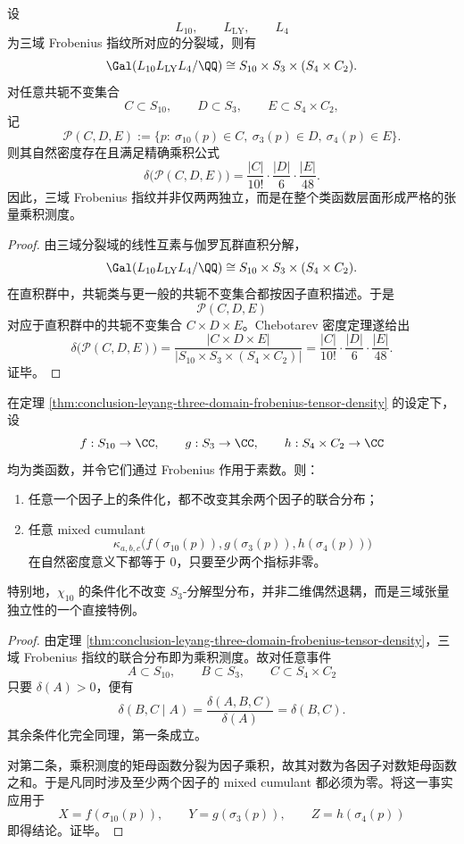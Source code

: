 \begin{theorem}\label{thm:conclusion-leyang-three-domain-frobenius-tensor-density}
设
\[
L_{10},\qquad L_{\mathrm{LY}},\qquad L_4
\]
为三域 Frobenius 指纹所对应的分裂域，则有
\[
\Gal(L_{10}L_{\mathrm{LY}}L_4/\QQ)
\cong
S_{10}\times S_3\times (S_4\times C_2).
\]
对任意共轭不变集合
\[
C\subset S_{10},\qquad D\subset S_3,\qquad E\subset S_4\times C_2,
\]
记
\[
\mathcal P(C,D,E)
:=
\{p:\ \sigma_{10}(p)\in C,\ \sigma_3(p)\in D,\ \sigma_4(p)\in E\}.
\]
则其自然密度存在且满足精确乘积公式
\[
\delta\bigl(\mathcal P(C,D,E)\bigr)
=
\frac{|C|}{10!}\cdot\frac{|D|}{6}\cdot\frac{|E|}{48}.
\]
因此，三域 Frobenius 指纹并非仅两两独立，而是在整个类函数层面形成严格的张量乘积测度。
\end{theorem}
\begin{proof}
由三域分裂域的线性互素与伽罗瓦群直积分解，
\[
\Gal(L_{10}L_{\mathrm{LY}}L_4/\QQ)
\cong
S_{10}\times S_3\times (S_4\times C_2).
\]
在直积群中，共轭类与更一般的共轭不变集合都按因子直积描述。于是
\[
\mathcal P(C,D,E)
\]
对应于直积群中的共轭不变集合 \(C\times D\times E\)。Chebotarev 密度定理遂给出
\[
\delta\bigl(\mathcal P(C,D,E)\bigr)
=
\frac{|C\times D\times E|}{|S_{10}\times S_3\times (S_4\times C_2)|}
=
\frac{|C|}{10!}\cdot\frac{|D|}{6}\cdot\frac{|E|}{48}.
\]
证毕。
\end{proof}

\begin{corollary}\label{cor:conclusion-leyang-three-domain-conditional-invariance-cumulant-vanish}
在定理 \ref{thm:conclusion-leyang-three-domain-frobenius-tensor-density} 的设定下，设
\[
f:S_{10}\to\CC,\qquad
g:S_3\to\CC,\qquad
h:S_4\times C_2\to\CC
\]
均为类函数，并令它们通过 Frobenius 作用于素数。则：
\begin{enumerate}
  \item 任意一个因子上的条件化，都不改变其余两个因子的联合分布；
  \item 任意 mixed cumulant
  \[
  \kappa_{a,b,c}\bigl(f(\sigma_{10}(p)),g(\sigma_3(p)),h(\sigma_4(p))\bigr)
  \]
  在自然密度意义下都等于 \(0\)，只要至少两个指标非零。
\end{enumerate}
特别地，\(\chi_{10}\) 的条件化不改变 \(S_3\)-分解型分布，并非二维偶然退耦，而是三域张量独立性的一个直接特例。
\end{corollary}
\begin{proof}
由定理 \ref{thm:conclusion-leyang-three-domain-frobenius-tensor-density}，三域 Frobenius 指纹的联合分布即为乘积测度。故对任意事件
\[
A\subset S_{10},\qquad B\subset S_3,\qquad C\subset S_4\times C_2
\]
只要 \(\delta(A)>0\)，便有
\[
\delta(B,C\mid A)
=
\frac{\delta(A,B,C)}{\delta(A)}
=
\delta(B,C).
\]
其余条件化完全同理，第一条成立。

对第二条，乘积测度的矩母函数分裂为因子乘积，故其对数为各因子对数矩母函数之和。于是凡同时涉及至少两个因子的 mixed cumulant 都必须为零。将这一事实应用于
\[
X=f(\sigma_{10}(p)),\qquad
Y=g(\sigma_3(p)),\qquad
Z=h(\sigma_4(p))
\]
即得结论。证毕。
\end{proof}


